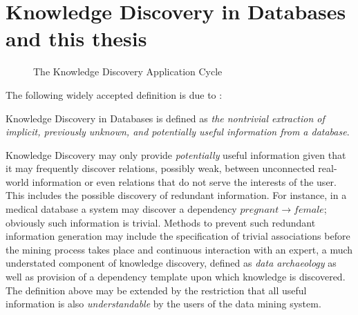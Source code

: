 \section{Knowledge Discovery in Databases and this thesis}\label{sec:int_kdd}

 
\begin{figure}
\centerline{}
\caption{\label{fig:kd_process}The Knowledge Discovery
Application Cycle}
\end{figure}

The following widely accepted definition is due to \cite{kdd96}:

\begin{definition}
\begin{rm} Knowledge Discovery in Databases is defined as {\em the nontrivial extraction of implicit, previously unknown, and potentially useful information from a database}.   
\end{rm}
\end{definition}

Knowledge Discovery may only provide {\em potentially} useful
information given that it may frequently discover relations, possibly
weak, between unconnected real-world information or even relations
that do not serve the interests of the user.  This includes the
possible discovery of redundant information. For instance, in a
medical database a system may discover a dependency $pregnant
\rightarrow female$; obviously such information is trivial.  Methods
to prevent such redundant information generation may include the
specification of trivial associations before the mining process takes
place and continuous interaction with an expert, a much understated
component of knowledge discovery, defined as {\em data
archaeology} as well as provision of a dependency template upon which
knowledge is discovered. The definition above may be extended by the restriction
that all useful information is also {\em understandable} by the users
of the data mining system. 

